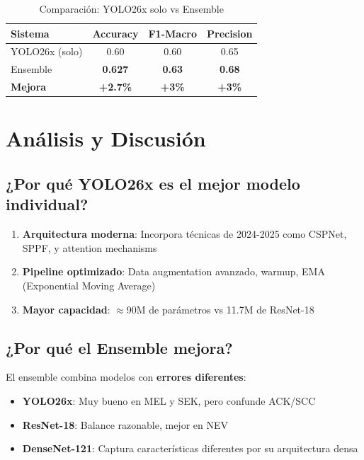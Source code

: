 \documentclass[12pt,a4paper]{article}
\begin{document}
\begin{table}[H]
\centering
\caption{Comparación: YOLO26x solo vs Ensemble}
\begin{tabular}{@{}lccc@{}}
\toprule
\textbf{Sistema} & \textbf{Accuracy} & \textbf{F1-Macro} & \textbf{Precision} \\
\midrule
YOLO26x (solo) & 0.60 & 0.60 & 0.65 \\
\rowcolor{green!20} Ensemble & \textbf{0.627} & \textbf{0.63} & \textbf{0.68} \\
\midrule
\textbf{Mejora} & \textbf{+2.7\%} & \textbf{+3\%} & \textbf{+3\%} \\
\bottomrule
\end{tabular}
\end{table}

\section{Análisis y Discusión}

\subsection{¿Por qué YOLO26x es el mejor modelo individual?}

\begin{enumerate}
    \item \textbf{Arquitectura moderna}: Incorpora técnicas de 2024-2025 como CSPNet, SPPF, y attention mechanisms
    \item \textbf{Pipeline optimizado}: Data augmentation avanzado, warmup, EMA (Exponential Moving Average)
    \item \textbf{Mayor capacidad}: $\approx$90M de parámetros vs 11.7M de ResNet-18
\end{enumerate}

\subsection{¿Por qué el Ensemble mejora?}

El ensemble combina modelos con \textbf{errores diferentes}:

\begin{itemize}
    \item \textbf{YOLO26x}: Muy bueno en MEL y SEK, pero confunde ACK/SCC
    \item \textbf{ResNet-18}: Balance razonable, mejor en NEV
    \item \textbf{DenseNet-121}: Captura características diferentes por su arquitectura densa
\end{itemize}
\end{document}
